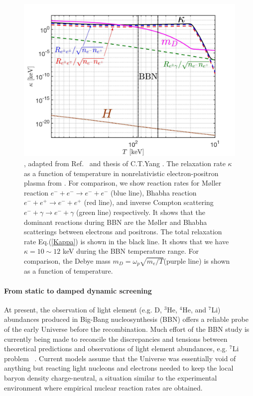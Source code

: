 \begin{figure}[h]
\begin{center}
\includegraphics[width=\linewidth]{./plots/May152023Kappa_EPPlasma}
\caption{, adapted from Ref.~\cite{Grayson:2023flr} and thesis of C.T.Yang \cite{Yang:2024ret}. The relaxation rate $\kappa$ as a function of temperature in nonrelativistic electron-positron plasma from \cite{Grayson:2023flr}. For comparison, we show  reaction rates  for M{\o}ller reaction $e^-+e^-\to e^-+e^-$ (blue line), Bhabha reaction $e^-+e^+\to e^-+e^+$ (red line), and inverse Compton scattering $e^-+\gamma\to e^-+\gamma$ (green line) respectively. It shows that the dominant reactions during BBN are the M{\o}ller and Bhabha scatterings between electrons and positrons. The total relaxation rate Eq.(\ref{Kappa}) is shown in the black line. It shows that we have $\kappa=10\sim12$ keV during the BBN temperature range. For comparison, the Debye mass $m_D=\omega_{p}\sqrt{m_e/T}$(purple line) is shown as a function of temperature.
}
\label{RelaxationRate_fig}
\end{center}
\end{figure}


\paragraph{From static to damped dynamic screening}

At present, the observation of light element (e.g. D, $^3$He, $^4$He, and $^7$Li) abundances produced in Big-Bang nucleosynthesis (BBN) offers a reliable probe of the early Universe before the recombination. Much effort of the BBN study is currently being made to reconcile the discrepancies and tensions between theoretical predictions and observations of light element abundances, e.g. $^7$Li problem ~\cite{Pitrou:2018cgg,Fields:2011zzb}.
Current models assume that the Universe was essentially void of anything but reacting light nucleons and electrons needed to keep the local baryon density charge-neutral, a situation similar to the experimental environment where empirical nuclear reaction rates are obtained.

